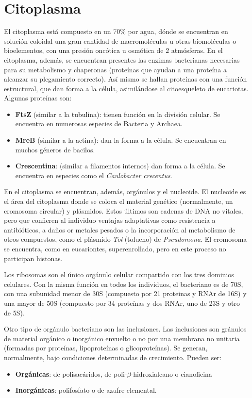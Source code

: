 \documentclass[10pt,a4paper,onecolumn,openany]{book}
\begin{document}
\section{Citoplasma}
El citoplasma está compuesto en un 70\% por agua, dónde se encuentran en solución coloidal una gran cantidad de macromoléculas u otras biomoléculas o bioelementos, con una presión oncótica u osmótica de 2 atmósferas. En el citoplasma, además, se encuentran presentes las enzimas bacterianas necesarias para su metabolismo y chaperonas (proteínas que ayudan a una proteína a alcanzar su plegamiento correcto). Así mismo se hallan proteínas con una función estructural, que dan forma a la célula, asimilándose al citoesqueleto de eucariotas. Algunas proteínas son:
\begin{itemize}[itemsep=0pt,parsep=0pt,topsep=0pt,partopsep=0pt]
	\item \textbf{FtsZ} (similar a la tubulina): tienen función en la división celular. Se encuentra en numerosas especies de Bacteria y Archaea.
	\item \textbf{MreB} (similar a la actina): dan la forma a la célula. Se encuentran en muchos géneros de bacilos.
	\item \textbf{Crescentina}: (similar a filamentos internos) dan forma a la célula. Se encuentra en especies como el \textit{Caulobacter crecentus}.
\end{itemize}

En el citoplasma se encuentran, además, orgánulos y el nucleoide. El nucleoide es el área del citoplasma donde se coloca el material genético (normalmente, un cromosoma circular) y plásmidos. Estos últimos son cadenas de DNA no vitales, pero que confieren al individuo ventajas adaptativas como resistencia a antibióticos, a daños or metales pesados o la incorporación al metabolismo de otros compuestos, como el plásmido \textit{Tol} (tolueno) de \textit{Pseudomona}. El cromosoma se encuentra, como en eucariontes, superenrollado, pero en este proceso no participan histonas.

Los ribosomas son el único orgánulo celular compartido con los tres dominios celulares. Con la misma función en todos los individuos, el bacteriano es de 70S, con una subunidad menor de 30S (compuesto por 21 proteinas y RNAr de 16S) y una mayor de 50S (compuesto por 34 proteínas y dos RNAr, uno de 23S y otro de 5S).

Otro tipo de orgánulo bacteriano son las inclusiones. Las inclusiones son gránulos de material orgánico o inorgánico envuelto o no por una membrana no unitaria (formadas por proteínas, lipoproteínas o glicoproteínas). Se generan, normalmente, bajo condiciones determinadas de crecimiento. Pueden ser:
\begin{itemize}[itemsep=0pt,parsep=0pt,topsep=0pt,partopsep=0pt]
	\item \textbf{Orgánicas}: de polisacáridos, de poli-$\beta$-hidroxialcano o cianoficina
	\item \textbf{Inorgánicas}: polifosfato o de azufre elemental. 
\end{itemize}
\end{document}
